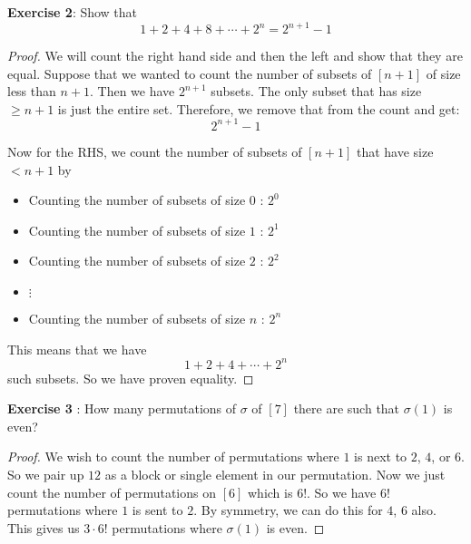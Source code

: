 \documentclass{article}
\begin{document}
\textbf{Exercise 2}: Show that
    \begin{equation*}
        1 + 2 + 4 + 8 + \cdots  + 2^{n} = 2^{n + 1} - 1
    \end{equation*}
        \begin{proof}
            We will count the right hand side and then the left and show that they are equal. Suppose that we wanted to count the number of subsets of $[n + 1]$ of size less than $n + 1$. Then we have $2^{n + 1}$ subsets. The only subset that has size $\geq n + 1$ is just the entire set. Therefore, we remove that from the count and get:
                \begin{equation*}
                    2^{n + 1} - 1
                \end{equation*}

            Now for the RHS, we count the number of subsets of $[n + 1]$ that have size $<  n + 1$ by 
                \begin{itemize}
                    \item Counting the number of subsets of size $0$ : $2^{0}$

                    \item Counting the number of subsets of size $1$ : $2^{1}$

                    \item Counting the number of subsets of size $2$ : $2^{2}$

                    \item $\vdots $

                    \item Counting the number of subsets of size $n$ : $2^{n}$ 
                \end{itemize}
            This means that we have 
                \begin{equation*}
                    1 + 2 + 4 + \cdots + 2^{n}
                \end{equation*}
            such subsets. So we have proven equality.
        \end{proof}

\textbf{Exercise 3} : How many permutations of $\sigma$ of $[7]$ there are such that $\sigma(1)$ is even?
    \begin{proof}
        We wish to count the number of permutations where $1$ is next to $2$, $4$, or $6$. So we pair up $12$ as a block or single element in our permutation. Now we just count the number of permutations on $[6]$ which is $6!$. So we have $6!$ permutations where $1$ is sent to $2$. By symmetry, we can do this for $4$, $6$ also. This gives us $3 \cdot 6!$ permutations where $\sigma(1)$ is even.
    \end{proof}
\end{document}
